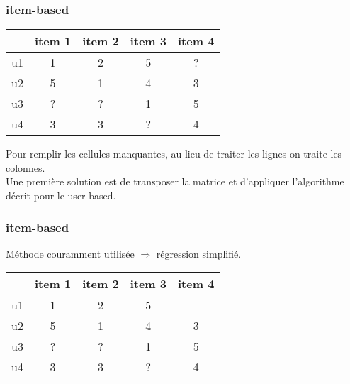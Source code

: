 \begin{frame}
  \frametitle{item-based}
  \begin{center}
    \begin{tabular}{|l|c|c|c|c|}
      \hline
      & item 1 & item 2 & item 3 & item 4 \\
      \hline
      u1 & 1 & 2 & 5 & ? \\
      \hline
      u2 & 5 & 1 & 4 & 3 \\
      \hline
      u3 & ? & ? & 1 & 5 \\
      \hline
      u4 & 3 & 3 & ? & 4 \\
      \hline
    \end{tabular}
  \end{center}
  Pour remplir les cellules manquantes, au lieu de traiter les lignes on traite les colonnes. \\
  Une première solution est de transposer la matrice et d'appliquer l'algorithme décrit pour le user-based.
\end{frame}

\begin{frame}
  \frametitle{item-based}
  Méthode couramment utilisée $\Rightarrow$ régression simplifié. \\
  \begin{center}
    \begin{tabular}{|l|c|c|c|c|}
      \hline
      & item 1 & item 2 & item 3 & item 4 \\
      \hline
      u1 & 1 & 2 & 5 & \red{?} \\
      \hline
      u2 & 5 & 1 & 4 & 3 \\
      \hline
      u3 & ? & ? & 1 & 5 \\
      \hline
      u4 & 3 & 3 & ? & 4 \\
      \hline
    \end{tabular}
  \end{center}
\end{frame}

